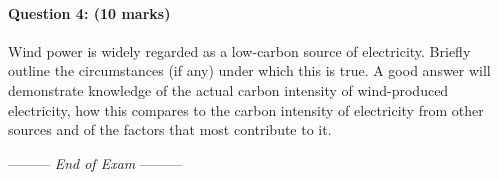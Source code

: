 \documentclass[a4paper,12pt,fleqn]{article}
\newcommand{\lastwords}{End of Exam}
\begin{document}
\paragraph{\textbf{Question 4: (10 marks)}}
Wind power is widely regarded as a low-carbon source of electricity. Briefly outline the circumstances (if any) under which this is true.
A good answer will demonstrate knowledge of the actual carbon intensity of wind-produced electricity, how this compares to the carbon intensity 
of electricity from other sources and of the factors that most contribute to it.


\begin{center}
\vspace{3cm}
--------- \textit{\lastwords} ---------
\end{center}


\label{finalpage}
\end{document}

